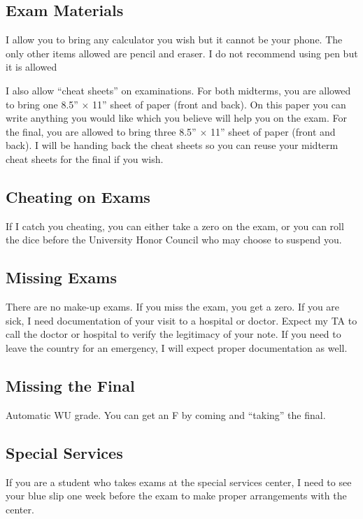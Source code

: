 \documentclass[12pt]{article}
\newcommand{\qu}[1]{``#1''}
\begin{document}
\subsection*{Exam Materials}

I allow you to bring any calculator you wish but it cannot be your phone. The only other items allowed are pencil and eraser. I do not recommend using pen but it is allowed

I also allow \qu{cheat sheets} on examinations. For both midterms, you are allowed to bring one 8.5'' $\times$ 11'' sheet of paper (front and back). On this paper you can write anything you would like which you believe will help you on the exam. For the final, you are allowed to bring three 8.5'' $\times$ 11'' sheet of paper (front and back). I will be handing back the cheat sheets so you can reuse your midterm cheat sheets for the final if you wish. 


\subsection*{Cheating on Exams}

If I catch you cheating, you can either take a zero on the exam, or you can roll the dice before the University Honor Council who may choose to suspend you.


\subsection*{Missing Exams}

There are no make-up exams. If you miss the exam, you get a zero. If you are sick, I need documentation of your visit to a hospital or doctor. Expect my TA to call the doctor or hospital to verify the legitimacy of your note. If you need to leave the country for an emergency, I will expect proper documentation as well.


\subsection*{Missing the Final}

Automatic WU grade. You can get an F by coming and \qu{taking} the final.

\subsection*{Special Services}

If you are a student who takes exams at the special services center, I need to see your blue slip one week before the exam to make proper arrangements with the center.
\end{document}
